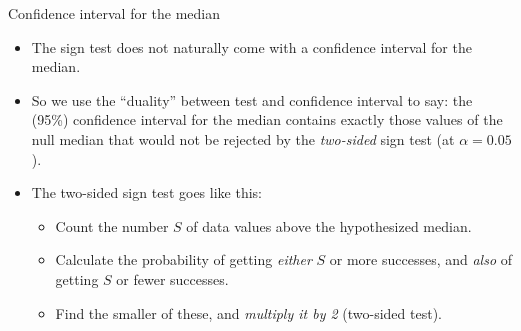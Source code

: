 \documentclass[unknownkeysallowed]{beamer}\usepackage[]{graphicx}\usepackage[]{color}
\begin{document}
\begin{frame}[fragile]{Confidence interval for the median}
  
  \begin{itemize}
  \item The sign test does not naturally come with a confidence
    interval for the median.
  \item So we use the ``duality'' between test and confidence interval
    to say: the (95\%) confidence interval for the median contains
    exactly those values of the null median that would not be rejected
    by the \emph{two-sided} sign test (at $\alpha=0.05$).
  \item The two-sided sign test goes like this:
    
    \begin{itemize}
    \item Count the number $S$ of data values above the
      hypothesized median.
    \item Calculate the probability of getting \emph{either} $S$ or
      more successes, and \emph{also} of getting $S$ or fewer
      successes.
    \item Find the smaller of these, and \emph{multiply it by 2}
      (two-sided test).
    \end{itemize}
  \end{itemize}
  
\end{frame}
\end{document}
